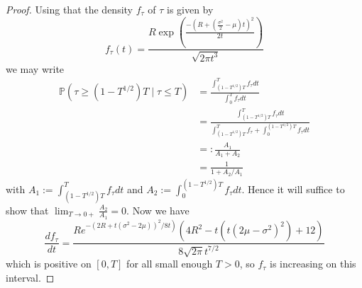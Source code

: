\documentclass{article}
\theoremstyle{definition}
\theoremstyle{definition}
\begin{document}
\begin{proof} Using that the density $f_{\tau}$ of $\tau$ is given by
$$
f_{\tau}(t)=\frac{R \exp \left(\frac{-\left(R+\left(\frac{\sigma^{2}}{2}-\mu\right) t\right)^{2}}{2 t}\right)}{\sqrt{2 \pi t^{3}}}
$$
we may write
$$
\begin{aligned}
\mathbb{P}\left(\tau \geq\left(1-T^{1 / 2}\right) T \mid \tau \leq T\right) & =\frac{\int_{\left(1-T^{1 / 2}\right) T}^{T} f_{\tau} d t}{\int_{0}^{T} f_{\tau} d t} \\
& =\frac{\int_{\left(1-T^{1 / 2}\right) T}^{T} f_{\tau} d t}{\int_{\left(1-T^{1 / 2}\right) T}^{T} f_{\tau}+\int_{0}^{\left(1-T^{1 / 2}\right) T} f_{\tau} d t} \\
& =: \frac{A_{1}}{A_{1}+A_{2}} \\
& =\frac{1}{1+A_{2} / A_{1}}
\end{aligned}
$$
with $A_{1}:=\int_{\left(1-T^{1 / 2}\right) T}^{T} f_{\tau} d t$ and $A_{2}:=\int_{0}^{\left(1-T^{1 / 2}\right) T} f_{\tau} d t$. Hence it will suffice to show that $\lim _{T \rightarrow 0+} \frac{A_{2}}{A_{1}}=0$. Now we have
$$
\frac{d f_{\tau}}{d t}=\frac{R e^{\left.-\left(2 R+t\left(\sigma^{2}-2 \mu\right)\right)^{2} / 8 t\right)}\left(4 R^{2}-t\left(t\left(2 \mu-\sigma^{2}\right)^{2}\right)+12\right)}{8 \sqrt{2 \pi} t^{7 / 2}}
$$
which is positive on $[0, T]$ for all small enough $T>0$, so $f_{\tau}$ is increasing on this interval.


\end{proof}
\end{document}
